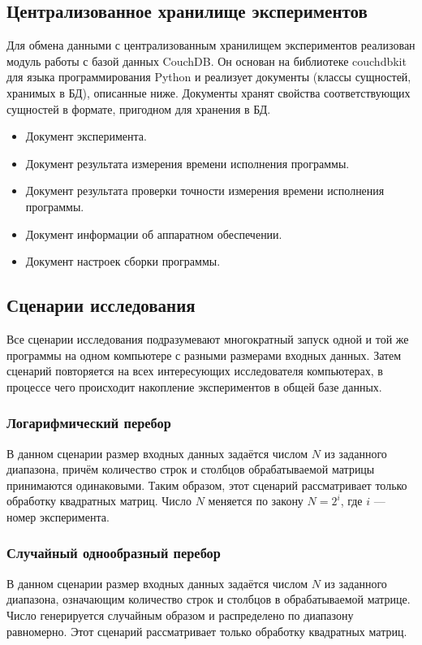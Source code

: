 \subsection{Централизованное хранилище экспериментов}

Для обмена данными с централизованным хранилищем экспериментов реализован модуль работы с базой данных CouchDB. Он основан на библиотеке couchdbkit \cite{couchdbkit} для языка программирования Python и реализует документы (классы сущностей, хранимых в БД), описанные ниже. Документы хранят свойства соответствующих сущностей в формате, пригодном для хранения в БД.

\begin{itemize}

\item Документ эксперимента.
\item Документ результата измерения времени исполнения программы.
\item Документ результата проверки точности измерения времени исполнения программы.
\item Документ информации об аппаратном обеспечении.
\item Документ настроек сборки программы.

\end{itemize}

\subsection{Сценарии исследования}

Все сценарии исследования подразумевают многократный запуск одной и той же программы на одном компьютере с разными размерами входных данных. Затем сценарий повторяется на всех интересующих исследователя компьютерах, в процессе чего происходит накопление экспериментов в общей базе данных.

\subsubsection{Логарифмический перебор}

В данном сценарии размер входных данных задаётся числом $N$ из заданного диапазона, причём количество строк и столбцов обрабатываемой матрицы принимаются одинаковыми. Таким образом, этот сценарий рассматривает только обработку квадратных матриц. Число $N$ меняется по закону $N = 2 ^ i$, где $i$ --- номер эксперимента.

\subsubsection{Случайный однообразный перебор}
В данном сценарии размер входных данных задаётся числом $N$ из заданного диапазона, означающим количество строк и столбцов в обрабатываемой матрице. Число генерируется случайным образом и распределено по диапазону равномерно. Этот сценарий рассматривает только обработку квадратных матриц. 

